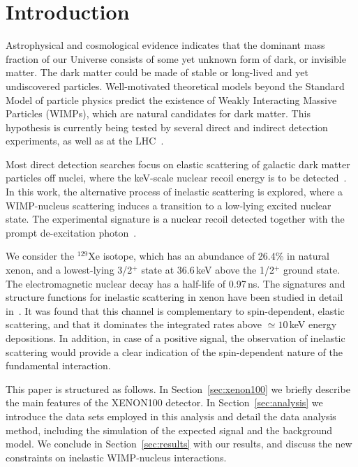 \section{\label{sec:intro} Introduction}

Astrophysical and cosmological evidence indicates that the dominant mass fraction of our Universe consists of some yet unknown
form of dark, or invisible matter. The dark matter could be made of stable or long-lived and yet undiscovered particles. Well-motivated
theoretical models beyond the Standard Model of particle physics predict the existence of Weakly Interacting Massive
Particles (WIMPs), which are natural candidates for dark matter. This hypothesis is currently being tested by several direct
and indirect detection experiments, as well as at the LHC~\cite{Bertone:2010zza,Baudis:2016qwx}.

Most direct detection searches focus on elastic scattering of galactic dark matter particles off nuclei, where the keV-scale 
nuclear recoil energy is to be detected~\cite{Baudis:2012ig,Undagoitia:2015gya,Baudis:2015mpa}. In this work, the 
alternative process of inelastic scattering is explored, where a WIMP-nucleus scattering induces a transition to a low-lying 
excited nuclear state. The experimental signature is a nuclear recoil detected together with the prompt de-excitation 
photon~\cite{Ellis:1988nb}. 

We consider the $^{129}\text{Xe}$ isotope, which has an abundance of 26.4\% in natural xenon, and a lowest-lying 
3/2$^{+}$ state at 36.6\,keV above the 1/2$^+$ ground state. The electromagnetic nuclear decay has a half-life of 0.97\,ns. 
The signatures and structure functions for inelastic scattering in xenon have been studied in detail in~\cite{Baudis:2013bba}. It was found that this channel is complementary to spin-dependent, elastic scattering, and that it dominates the integrated rates above $\simeq10$\,keV energy depositions. 
In addition, in case of a positive signal, the observation of inelastic scattering would provide a clear 
indication of the spin-dependent nature of the fundamental interaction. 

This paper is structured as follows.  In Section~\ref{sec:xenon100} we briefly describe the main features of the XENON100 detector.  In Section~\ref{sec:analysis} we introduce the data 
sets employed in this analysis and detail the data analysis method, including the simulation of the expected signal and the 
background model. We conclude in Section~\ref{sec:results} with our results, and discuss the new constraints on inelastic WIMP-nucleus interactions.

